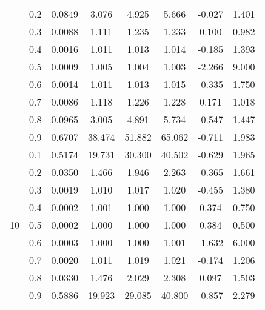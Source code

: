\documentclass[11pt,a4paper]{report}
\begin{document}
\begin{longtable}{ | c | c || c | c | c | c | c | c | }
 & 0.2 & 0.0849 & 3.076 & 4.925 & 5.666 & -0.027 & 1.401 \\
 & 0.3 & 0.0088 & 1.111 & 1.235 & 1.233 & 0.100 & 0.982 \\
 & 0.4 & 0.0016 & 1.011 & 1.013 & 1.014 & -0.185 & 1.393 \\
 & 0.5 & 0.0009 & 1.005 & 1.004 & 1.003 & -2.266 & 9.000 \\
 & 0.6 & 0.0014 & 1.011 & 1.013 & 1.015 & -0.335 & 1.750 \\
 & 0.7 & 0.0086 & 1.118 & 1.226 & 1.228 & 0.171 & 1.018 \\
 & 0.8 & 0.0965 & 3.005 & 4.891 & 5.734 & -0.547 & 1.447 \\
 & 0.9 & 0.6707 & 38.474 & 51.882 & 65.062 & -0.711 & 1.983 \\
 \hline
\multirow{9}{*}{10} & 0.1 & 0.5174 & 19.731 & 30.300 & 40.502 & -0.629 & 1.965 \\
 & 0.2 & 0.0350 & 1.466 & 1.946 & 2.263 & -0.365 & 1.661 \\
 & 0.3 & 0.0019 & 1.010 & 1.017 & 1.020 & -0.455 & 1.380 \\
 & 0.4 & 0.0002 & 1.001 & 1.000 & 1.000 & 0.374 & 0.750 \\
 & 0.5 & 0.0002 & 1.000 & 1.000 & 1.000 & 0.384 & 0.500 \\
 & 0.6 & 0.0003 & 1.000 & 1.000 & 1.001 & -1.632 & 6.000 \\
 & 0.7 & 0.0020 & 1.011 & 1.019 & 1.021 & -0.174 & 1.206 \\
 & 0.8 & 0.0330 & 1.476 & 2.029 & 2.308 & 0.097 & 1.503 \\
 & 0.9 & 0.5886 & 19.923 & 29.085 & 40.800 & -0.857 & 2.279 \\
 \hline
\hline
\end{longtable}
\end{document}
